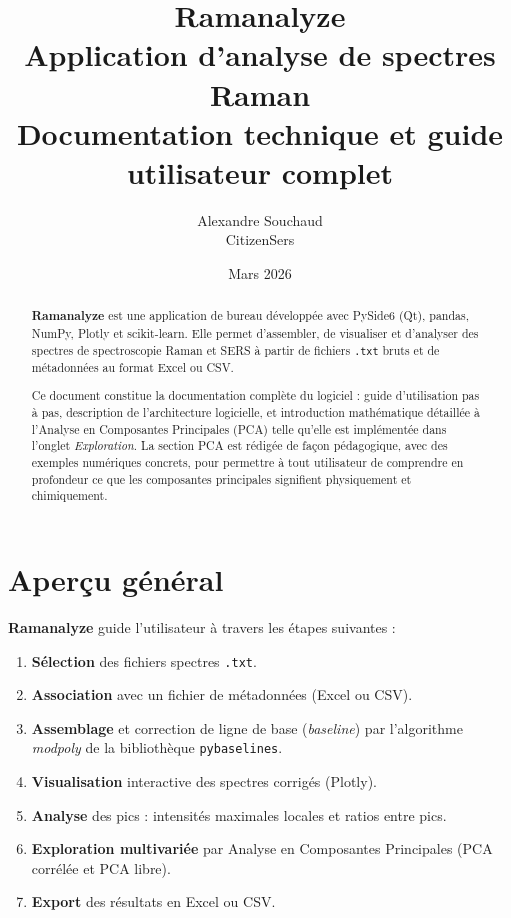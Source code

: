 \documentclass[12pt, a4paper]{article}
\title{%
  \textbf{\LARGE Ramanalyze}\\[0.5em]
  \Large Application d'analyse de spectres Raman\\[0.8em]
  \large Documentation technique et guide utilisateur complet
}
\author{Alexandre Souchaud \\ \small CitizenSers}
\date{Mars 2026}
\begin{document}

\maketitle
\thispagestyle{fancy}

\begin{abstract}
\textbf{Ramanalyze} est une application de bureau développée avec PySide6
(Qt), pandas, NumPy, Plotly et scikit-learn. Elle permet d'assembler, de
visualiser et d'analyser des spectres de spectroscopie Raman et SERS à partir
de fichiers \texttt{.txt} bruts et de métadonnées au format Excel ou CSV.

Ce document constitue la documentation complète du logiciel : guide
d'utilisation pas à pas, description de l'architecture logicielle, et
introduction mathématique détaillée à l'Analyse en Composantes Principales
(PCA) telle qu'elle est implémentée dans l'onglet \textit{Exploration}. La
section PCA est rédigée de façon pédagogique, avec des exemples numériques
concrets, pour permettre à tout utilisateur de comprendre en profondeur ce que
les composantes principales signifient physiquement et chimiquement.
\end{abstract}

\tableofcontents
\newpage

\section{Aperçu général}

\textbf{Ramanalyze} guide l'utilisateur à travers les étapes suivantes :

\begin{enumerate}
  \item \textbf{Sélection} des fichiers spectres \texttt{.txt}.
  \item \textbf{Association} avec un fichier de métadonnées (Excel ou CSV).
  \item \textbf{Assemblage} et correction de ligne de base (\textit{baseline})
        par l'algorithme \textit{modpoly} de la bibliothèque \texttt{pybaselines}.
  \item \textbf{Visualisation} interactive des spectres corrigés (Plotly).
  \item \textbf{Analyse} des pics : intensités maximales locales et ratios entre
        pics.
  \item \textbf{Exploration multivariée} par Analyse en Composantes Principales
        (PCA corrélée et PCA libre).
  \item \textbf{Export} des résultats en Excel ou CSV.
\end{enumerate}
\end{document}
